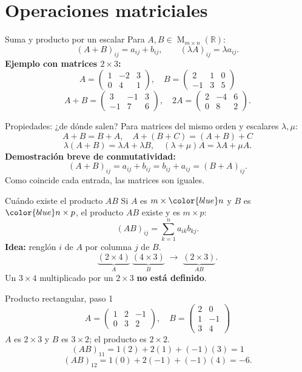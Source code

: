 \documentclass[aspectratio=169,11pt]{beamer}
\newcommand{\R}{\mathbb R}
\newcommand{\M}{\operatorname{M}}
\begin{document}
\section{Operaciones matriciales}
\begin{frame}{Suma y producto por un escalar}
Para $A,B\in\M_{m\times n}(\R)$:
\[(A+B)_{ij}=a_{ij}+b_{ij},\qquad(\lambda A)_{ij}=\lambda a_{ij}.\]
\textbf{Ejemplo con matrices $2\times3$:}
\[A=\begin{pmatrix}1&-2&3\\0&4&1\end{pmatrix},\quad B=\begin{pmatrix}2&1&0\\-1&3&5\end{pmatrix}\]
\[A+B=\begin{pmatrix}3&-1&3\\-1&7&6\end{pmatrix},\quad2A=\begin{pmatrix}2&-4&6\\0&8&2\end{pmatrix}.\]
\end{frame}
\begin{frame}{Propiedades: ¿de dónde salen?}
Para matrices del mismo orden y escalares $\lambda,\mu$:
\[A+B=B+A,\quad A+(B+C)=(A+B)+C\]
\[\lambda(A+B)=\lambda A+\lambda B,\quad(\lambda+\mu)A=\lambda A+\mu A.\]
\textbf{Demostración breve de conmutatividad:}
\[(A+B)_{ij}=a_{ij}+b_{ij}=b_{ij}+a_{ij}=(B+A)_{ij}.\]
Como coincide cada entrada, las matrices son iguales.
\end{frame}
\begin{frame}{Cuándo existe el producto $AB$}
Si $A$ es $m\times\color{blue}n$ y $B$ es $\color{blue}n\times p$, el producto $AB$ existe y es $m\times p$:
\[(AB)_{ij}=\sum_{k=1}^{n}a_{ik}b_{kj}.\]
\textbf{Idea:} renglón $i$ de $A$ por columna $j$ de $B$.
\[\underbrace{(2\times4)}_A\ \underbrace{(4\times3)}_B\;\longrightarrow\;\underbrace{(2\times3)}_{AB}.\]
Un $3\times4$ multiplicado por un $2\times3$ \textbf{no está definido}.
\end{frame}
\begin{frame}{Producto rectangular, paso 1}
\[A=\begin{pmatrix}1&2&-1\\0&3&2\end{pmatrix},\quad B=\begin{pmatrix}2&0\\1&-1\\3&4\end{pmatrix}\]
$A$ es $2\times3$ y $B$ es $3\times2$; el producto es $2\times2$.
\[(AB)_{11}=1(2)+2(1)+(-1)(3)=1\]
\[(AB)_{12}=1(0)+2(-1)+(-1)(4)=-6.\]
\end{frame}
\end{document}
